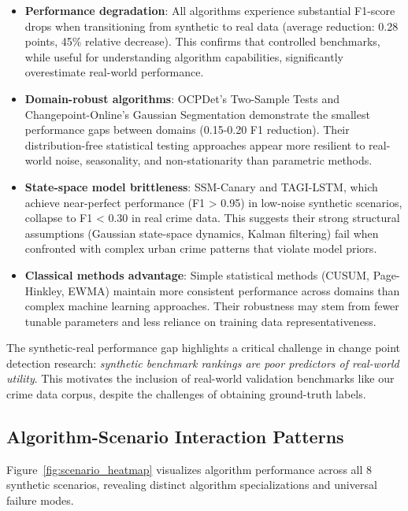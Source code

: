 \begin{itemize}
    \item \textbf{Performance degradation}: All algorithms experience substantial F1-score drops when transitioning from synthetic to real data (average reduction: 0.28 points, 45\% relative decrease). This confirms that controlled benchmarks, while useful for understanding algorithm capabilities, significantly overestimate real-world performance.
    
    \item \textbf{Domain-robust algorithms}: OCPDet's Two-Sample Tests and Changepoint-Online's Gaussian Segmentation demonstrate the smallest performance gaps between domains (0.15-0.20 F1 reduction). Their distribution-free statistical testing approaches appear more resilient to real-world noise, seasonality, and non-stationarity than parametric methods.
    
    \item \textbf{State-space model brittleness}: SSM-Canary and TAGI-LSTM, which achieve near-perfect performance (F1 > 0.95) in low-noise synthetic scenarios, collapse to F1 < 0.30 in real crime data. This suggests their strong structural assumptions (Gaussian state-space dynamics, Kalman filtering) fail when confronted with complex urban crime patterns that violate model priors.
    
    \item \textbf{Classical methods advantage}: Simple statistical methods (CUSUM, Page-Hinkley, EWMA) maintain more consistent performance across domains than complex machine learning approaches. Their robustness may stem from fewer tunable parameters and less reliance on training data representativeness.
\end{itemize}

The synthetic-real performance gap highlights a critical challenge in change point detection research: \textit{synthetic benchmark rankings are poor predictors of real-world utility}. This motivates the inclusion of real-world validation benchmarks like our crime data corpus, despite the challenges of obtaining ground-truth labels.


\subsection{Algorithm-Scenario Interaction Patterns}

Figure~\ref{fig:scenario_heatmap} visualizes algorithm performance across all 8 synthetic scenarios, revealing distinct algorithm specializations and universal failure modes.


